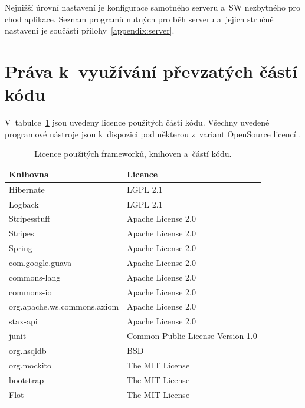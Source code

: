 \documentclass[11pt, draft, oneside]{fithesis2}
\begin{document}
Nejnižší úrovní nastavení je konfigurace samotného serveru a~SW nezbytného pro chod aplikace. Seznam programů nutných pro běh serveru a~jejich stručné nastavení je součástí přílohy~\ref{appendix:server}.

\section{Práva k~využívání převzatých částí kódu}
V~tabulce~\ref{tab:libraries:license} jsou uvedeny licence použitých částí kódu.
Všechny uvedené programové nástroje jsou k~dispozici pod některou z~variant OpenSource licencí \cite{Licence}.

\begin{table}[ht] 
\centering
\begin{tabular}{l l}
\hline 
Knihovna & Licence \\
\hline \hline
Hibernate 									& LGPL 2.1 \\
Logback 										& LGPL 2.1 \\
Stripesstuff 								& Apache License 2.0 \\ 
Stripes 										& Apache License 2.0 \\ 
Spring 											& Apache License 2.0 \\ 
com.google.guava 						& Apache License 2.0 \\
commons-lang 								& Apache License 2.0 \\
commons-io 									& Apache License 2.0 \\
org.apache.ws.commons.axiom & Apache License 2.0 \\
stax-api 										& Apache License 2.0 \\
junit 											& Common Public License Version 1.0 \\
org.hsqldb 									& BSD \\
org.mockito 								& The MIT License \\
bootstrap 									& The MIT License \\
Flot 												& The MIT License \\

\hline %
\end{tabular} 
\caption{Licence použitých frameworků, knihoven a~částí kódu.}
\label{tab:libraries:license} %
\end{table} 
\end{document}
